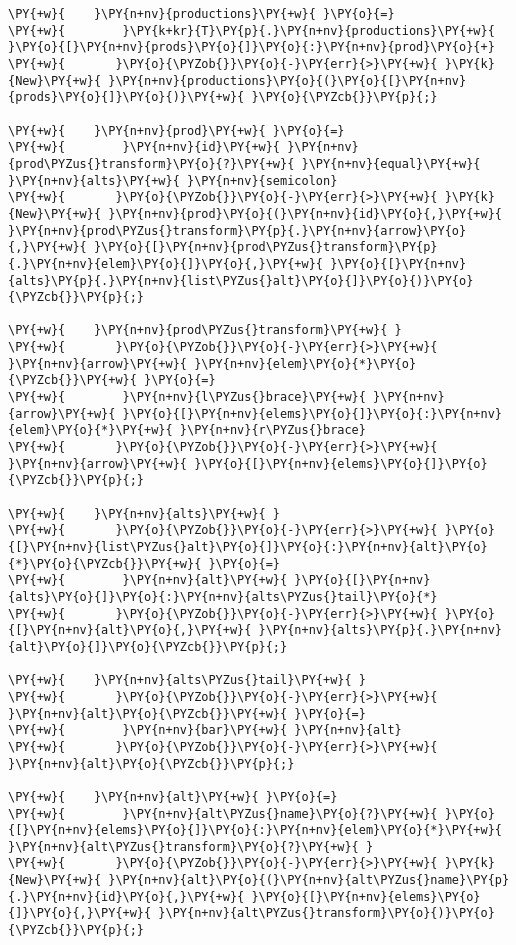 \begin{Verbatim}[commandchars=\\\{\}]
\PY{+w}{    }\PY{n+nv}{productions}\PY{+w}{ }\PY{o}{=}
\PY{+w}{        }\PY{k+kr}{T}\PY{p}{.}\PY{n+nv}{productions}\PY{+w}{ }\PY{o}{[}\PY{n+nv}{prods}\PY{o}{]}\PY{o}{:}\PY{n+nv}{prod}\PY{o}{+}
\PY{+w}{	   }\PY{o}{\PYZob{}}\PY{o}{-}\PY{err}{>}\PY{+w}{ }\PY{k}{New}\PY{+w}{ }\PY{n+nv}{productions}\PY{o}{(}\PY{o}{[}\PY{n+nv}{prods}\PY{o}{]}\PY{o}{)}\PY{+w}{ }\PY{o}{\PYZcb{}}\PY{p}{;}

\PY{+w}{    }\PY{n+nv}{prod}\PY{+w}{ }\PY{o}{=}
\PY{+w}{        }\PY{n+nv}{id}\PY{+w}{ }\PY{n+nv}{prod\PYZus{}transform}\PY{o}{?}\PY{+w}{ }\PY{n+nv}{equal}\PY{+w}{ }\PY{n+nv}{alts}\PY{+w}{ }\PY{n+nv}{semicolon}
\PY{+w}{	   }\PY{o}{\PYZob{}}\PY{o}{-}\PY{err}{>}\PY{+w}{ }\PY{k}{New}\PY{+w}{ }\PY{n+nv}{prod}\PY{o}{(}\PY{n+nv}{id}\PY{o}{,}\PY{+w}{ }\PY{n+nv}{prod\PYZus{}transform}\PY{p}{.}\PY{n+nv}{arrow}\PY{o}{,}\PY{+w}{ }\PY{o}{[}\PY{n+nv}{prod\PYZus{}transform}\PY{p}{.}\PY{n+nv}{elem}\PY{o}{]}\PY{o}{,}\PY{+w}{ }\PY{o}{[}\PY{n+nv}{alts}\PY{p}{.}\PY{n+nv}{list\PYZus{}alt}\PY{o}{]}\PY{o}{)}\PY{o}{\PYZcb{}}\PY{p}{;}

\PY{+w}{    }\PY{n+nv}{prod\PYZus{}transform}\PY{+w}{ }
\PY{+w}{	   }\PY{o}{\PYZob{}}\PY{o}{-}\PY{err}{>}\PY{+w}{ }\PY{n+nv}{arrow}\PY{+w}{ }\PY{n+nv}{elem}\PY{o}{*}\PY{o}{\PYZcb{}}\PY{+w}{ }\PY{o}{=}
\PY{+w}{        }\PY{n+nv}{l\PYZus{}brace}\PY{+w}{ }\PY{n+nv}{arrow}\PY{+w}{ }\PY{o}{[}\PY{n+nv}{elems}\PY{o}{]}\PY{o}{:}\PY{n+nv}{elem}\PY{o}{*}\PY{+w}{ }\PY{n+nv}{r\PYZus{}brace}
\PY{+w}{	   }\PY{o}{\PYZob{}}\PY{o}{-}\PY{err}{>}\PY{+w}{ }\PY{n+nv}{arrow}\PY{+w}{ }\PY{o}{[}\PY{n+nv}{elems}\PY{o}{]}\PY{o}{\PYZcb{}}\PY{p}{;}

\PY{+w}{    }\PY{n+nv}{alts}\PY{+w}{ }
\PY{+w}{	   }\PY{o}{\PYZob{}}\PY{o}{-}\PY{err}{>}\PY{+w}{ }\PY{o}{[}\PY{n+nv}{list\PYZus{}alt}\PY{o}{]}\PY{o}{:}\PY{n+nv}{alt}\PY{o}{*}\PY{o}{\PYZcb{}}\PY{+w}{ }\PY{o}{=}
\PY{+w}{        }\PY{n+nv}{alt}\PY{+w}{ }\PY{o}{[}\PY{n+nv}{alts}\PY{o}{]}\PY{o}{:}\PY{n+nv}{alts\PYZus{}tail}\PY{o}{*}
\PY{+w}{	   }\PY{o}{\PYZob{}}\PY{o}{-}\PY{err}{>}\PY{+w}{ }\PY{o}{[}\PY{n+nv}{alt}\PY{o}{,}\PY{+w}{ }\PY{n+nv}{alts}\PY{p}{.}\PY{n+nv}{alt}\PY{o}{]}\PY{o}{\PYZcb{}}\PY{p}{;}

\PY{+w}{    }\PY{n+nv}{alts\PYZus{}tail}\PY{+w}{ }
\PY{+w}{	   }\PY{o}{\PYZob{}}\PY{o}{-}\PY{err}{>}\PY{+w}{ }\PY{n+nv}{alt}\PY{o}{\PYZcb{}}\PY{+w}{ }\PY{o}{=}
\PY{+w}{        }\PY{n+nv}{bar}\PY{+w}{ }\PY{n+nv}{alt}
\PY{+w}{	   }\PY{o}{\PYZob{}}\PY{o}{-}\PY{err}{>}\PY{+w}{ }\PY{n+nv}{alt}\PY{o}{\PYZcb{}}\PY{p}{;}

\PY{+w}{    }\PY{n+nv}{alt}\PY{+w}{ }\PY{o}{=}
\PY{+w}{        }\PY{n+nv}{alt\PYZus{}name}\PY{o}{?}\PY{+w}{ }\PY{o}{[}\PY{n+nv}{elems}\PY{o}{]}\PY{o}{:}\PY{n+nv}{elem}\PY{o}{*}\PY{+w}{ }\PY{n+nv}{alt\PYZus{}transform}\PY{o}{?}\PY{+w}{ }
\PY{+w}{	   }\PY{o}{\PYZob{}}\PY{o}{-}\PY{err}{>}\PY{+w}{ }\PY{k}{New}\PY{+w}{ }\PY{n+nv}{alt}\PY{o}{(}\PY{n+nv}{alt\PYZus{}name}\PY{p}{.}\PY{n+nv}{id}\PY{o}{,}\PY{+w}{ }\PY{o}{[}\PY{n+nv}{elems}\PY{o}{]}\PY{o}{,}\PY{+w}{ }\PY{n+nv}{alt\PYZus{}transform}\PY{o}{)}\PY{o}{\PYZcb{}}\PY{p}{;}


\end{Verbatim}
